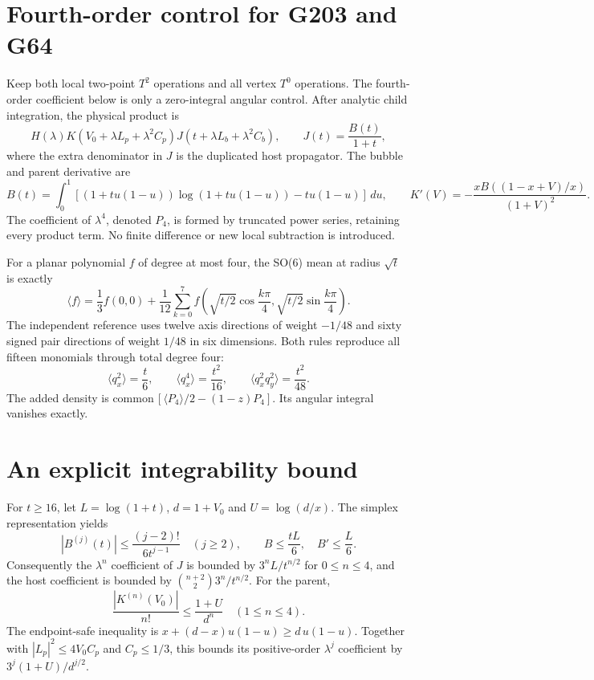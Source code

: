\documentclass[11pt]{article}
\begin{document}
\section{Fourth-order control for G203 and G64}
Keep both local two-point $T^2$ operations and all vertex $T^0$ operations.
The fourth-order coefficient below is only a zero-integral angular control.
After analytic child integration, the physical product is
\[
 H(\lambda)K(V_0+\lambda L_p+\lambda^2C_p)
 J(t+\lambda L_b+\lambda^2C_b),\qquad J(t)=\frac{B(t)}{1+t},
\]
where the extra denominator in $J$ is the duplicated host propagator.
The bubble and parent derivative are
\[
 B(t)=\int_0^1[(1+tu(1-u))\log(1+tu(1-u))-tu(1-u)]\,du,
 \qquad K'(V)=-\frac{x B((1-x+V)/x)}{(1+V)^2}.
\]
The coefficient of $\lambda^4$, denoted $P_4$, is formed by truncated power
series, retaining every product term. No finite difference or new local
subtraction is introduced.

For a planar polynomial $f$ of degree at most four, the SO(6) mean at radius
$\sqrt t$ is exactly
\[
 \langle f\rangle=\frac13f(0,0)+\frac1{12}
  \sum_{k=0}^{7} f\left(\sqrt{t/2}\cos\frac{k\pi}{4},
                         \sqrt{t/2}\sin\frac{k\pi}{4}\right).
\]
The independent reference uses twelve axis directions of weight $-1/48$
and sixty signed pair directions of weight $1/48$ in six dimensions.
Both rules reproduce all fifteen monomials through total degree four:
\[
 \langle q_x^2\rangle=\frac t6,\qquad
 \langle q_x^4\rangle=\frac{t^2}{16},\qquad
 \langle q_x^2q_y^2\rangle=\frac{t^2}{48}.
\]
The added density is
$\mathrm{common}\,[\langle P_4\rangle/2-(1-z)P_4]$.
Its angular integral vanishes exactly.

\section{An explicit integrability bound}
For $t\ge16$, let $L=\log(1+t)$, $d=1+V_0$ and $U=\log(d/x)$.
The simplex representation yields
\[
 |B^{(j)}(t)|\le\frac{(j-2)!}{6t^{j-1}}\quad(j\ge2),\qquad
 B\le\frac{tL}{6},\quad B'\le\frac L6.
\]
Consequently the $\lambda^n$ coefficient of $J$ is bounded by
$3^nL/t^{n/2}$ for $0\le n\le4$, and the host coefficient is bounded by
$\binom{n+2}{2}3^n/t^{n/2}$.
For the parent,
\[
 \frac{|K^{(n)}(V_0)|}{n!}\le\frac{1+U}{d^n}\quad(1\le n\le4).
\]
The endpoint-safe inequality is
$x+(d-x)u(1-u)\ge d\,u(1-u)$.
Together with $|L_p|^2\le4V_0C_p$ and $C_p\le1/3$, this bounds its
positive-order $\lambda^j$ coefficient by $3^j(1+U)/d^{j/2}$.
\end{document}
